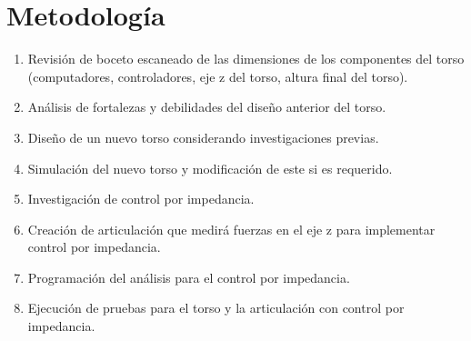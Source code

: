 \section{Metodología}
\begin{enumerate}  %
	\item Revisión de boceto escaneado de las dimensiones de los componentes del torso (computadores, controladores, eje z del torso, altura final del torso).
	\item Análisis de fortalezas y debilidades del diseño anterior del torso.
	\item Diseño de un nuevo torso considerando investigaciones previas.
	\item Simulación del nuevo torso y modificación de este si es requerido.
	\item Investigación de control por impedancia.
	\item Creación de articulación que medirá fuerzas en el eje z para implementar control por impedancia.
	\item Programación del análisis para el control por impedancia.
	\item Ejecución de pruebas para el torso y la articulación con control por impedancia.
\end{enumerate}